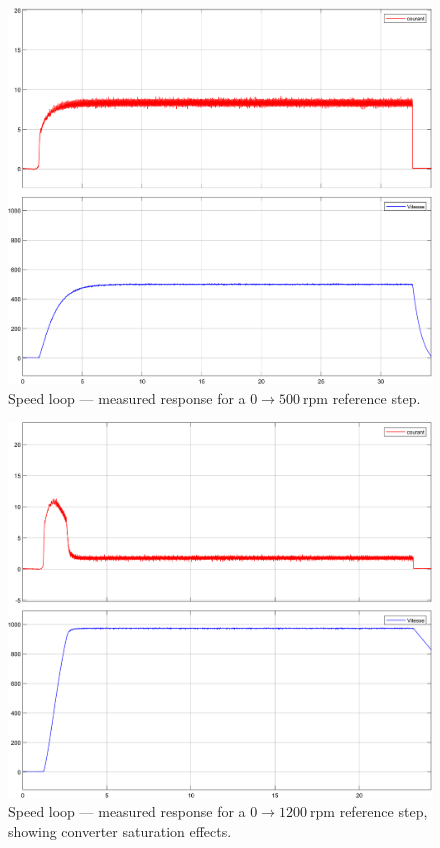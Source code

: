 \documentclass{rapportCS}
\begin{document}
\begin{figure}[H]
    \centering
    \includegraphics[width=\linewidth, keepaspectratio]{figures/p500.png}
    \caption{Speed loop --- measured response for a $0 \rightarrow 500~\text{rpm}$ reference step.}
    \label{fig:exp_W_500}
\end{figure}

\begin{figure}[H]
    \centering
    \includegraphics[width=\linewidth, keepaspectratio]{figures/p1200.png}
    \caption{Speed loop --- measured response for a $0 \rightarrow 1200~\text{rpm}$ reference step, showing converter saturation effects.}
    \label{fig:exp_W_1200}
\end{figure}
\end{document}
